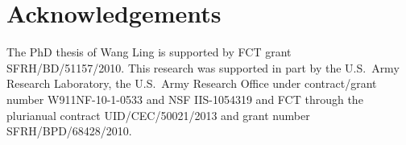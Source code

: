 \documentclass[11pt]{article}
\begin{document}
\section*{Acknowledgements}
The PhD thesis of Wang Ling is supported by FCT grant SFRH/BD/51157/2010.
This research was supported in part by the U.S.~Army Research Laboratory, the U.S.~Army Research Office
under contract/grant number W911NF-10-1-0533 and NSF IIS-1054319 and FCT through the plurianual contract UID/CEC/50021/2013 and grant number SFRH/BPD/68428/2010. 


\end{document}
